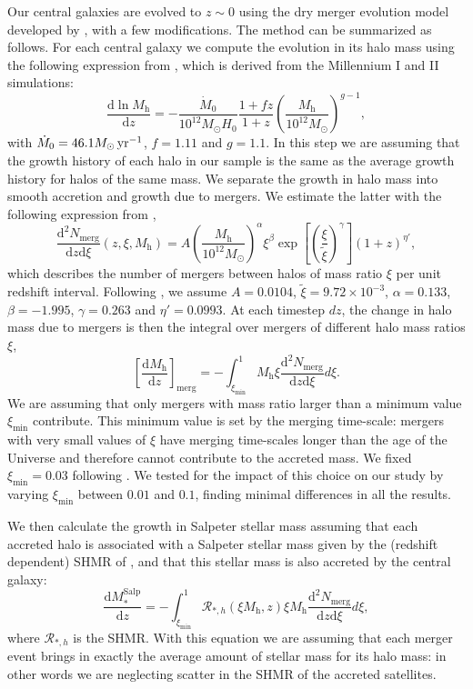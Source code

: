 \documentclass[usenatbib]{mnras}
\def\mhalo{M_{\mathrm{h}}}
\def\ximin{\xi_{\mathrm{min}}}
\def\msalp{M_*^{\mathrm{Salp}}}
\begin{document}
Our central galaxies are evolved to $z\sim0$ using the dry merger evolution model developed by \citet{Nip++12}, with a few modifications.
The method can be summarized as follows.
For each central galaxy we compute the evolution in its halo mass  using the following expression from \citet{FMB10}, which is derived from the Millennium I and II simulations:
\begin{equation}
\frac{\mathrm{d}\ln{\mhalo}}{\mathrm{d}z} = - \frac{\dot{M}_0}{10^{12}M_\odot H_0}\frac{1 + fz}{1 + z}\left(\frac{\mhalo}{10^{12}M_\odot}\right)^{g-1},
\end{equation}
with $\dot{M}_0 = 46.1 M_\odot \rm{\, yr}^{-1}$, $f=1.11$ and $g=1.1$.
In this step we are assuming that the growth history of each halo in our sample is the same as the average growth history for halos of the same mass.
We separate the growth in halo mass into smooth accretion and growth due to mergers. We estimate the latter with the following expression from \citet{FMB10},
\begin{equation}\label{eq:nmerg}
\frac{\mathrm{d}^2N_{\mathrm{merg}}}{\mathrm{d}z \mathrm{d}\xi}(z, \xi, \mhalo) = A\left(\frac{\mhalo}{10^{12}M_\odot}\right)^\alpha \xi ^\beta \exp{\left[\left(\frac{\xi}{\tilde{\xi}}\right)^\gamma\right]}(1 + z)^{\eta'},
\end{equation}
which describes the number of mergers between halos of mass ratio
$\xi$ per unit redshift interval.  Following \citet{FMB10}, we assume
$A=0.0104$, $\tilde{\xi}=9.72\times10^{-3}$, $\alpha=0.133$,
$\beta=-1.995$, $\gamma=0.263$ and $\eta'=0.0993$.  At each timestep
$dz$, the change in halo mass due to mergers is then the integral
over mergers of different halo mass ratios $\xi$,
\begin{equation}
\left[\frac{\mathrm{d}\mhalo}{\mathrm{d}z}\right]_{\mathrm{merg}} = -\int_{\ximin}^1 \mhalo\xi \frac{\mathrm{d}^2N_{\mathrm{merg}}}{\mathrm{d}z \mathrm{d}\xi} d\xi.
\end{equation}
We are assuming that only mergers with mass ratio larger than a
minimum value $\ximin$ contribute. This minimum value is set by the
merging time-scale: mergers with very small values of $\xi$ have
merging time-scales longer than the age of the Universe and therefore
cannot contribute to the accreted mass. We fixed $\ximin=0.03$
following \citet{Nip++12}. We tested for the impact of this choice on
our study by varying $\ximin$ between $0.01$ and $0.1$, finding
minimal differences in all the results.

We then calculate the growth in Salpeter stellar mass assuming that
each accreted halo is associated with a Salpeter stellar mass
  given by the (redshift dependent) SHMR of \citet{Lea++12}, and that this stellar
mass is also accreted by the central galaxy:
\begin{equation}
\frac{\mathrm{d}\msalp}{\mathrm{d}z} = -\int_{\ximin}^1 \mathcal{R}_{*,h}(\xi \mhalo, z)\xi\mhalo\frac{\mathrm{d}^2N_{\mathrm{merg}}}{\mathrm{d}z \mathrm{d}\xi} d\xi,
\end{equation}
where
$\mathcal{R}_{*,h}$ is the SHMR. With this equation we are assuming
that each merger event brings in exactly the average amount of stellar
mass for its halo mass: in other words we are neglecting scatter
  in the SHMR of the accreted satellites.
\end{document}
